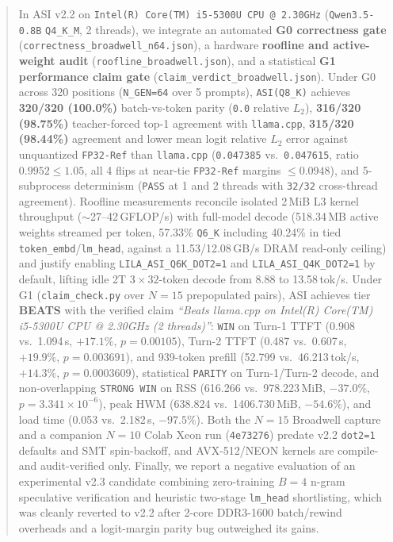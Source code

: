 \documentclass[11pt,a4paper]{article}
\begin{document}
\begin{abstract}
In ASI v2.2 on \texttt{Intel(R) Core(TM) i5-5300U CPU @ 2.30GHz} (\texttt{Qwen3.5-0.8B} \texttt{Q4\_K\_M}, 2 threads), we integrate an automated \textbf{G0 correctness gate} (\texttt{correctness\_broadwell\_n64.json}), a hardware \textbf{roofline and active-weight audit} (\texttt{roofline\_broadwell.json}), and a statistical \textbf{G1 performance claim gate} (\texttt{claim\_verdict\_broadwell.json}). Under G0 across 320 positions (\texttt{N\_GEN=64} over 5 prompts), \texttt{ASI(Q8\_K)} achieves \textbf{320/320 (100.0\%)} batch-vs-token parity (\texttt{0.0} relative $L_2$), \textbf{316/320 (98.75\%)} teacher-forced top-1 agreement with \texttt{llama.cpp}, \textbf{315/320 (98.44\%)} agreement and lower mean logit relative $L_2$ error against unquantized \texttt{FP32-Ref} than \texttt{llama.cpp} (\texttt{0.047385} vs.\ \texttt{0.047615}, ratio $0.9952 \le 1.05$, all 4 flips at near-tie \texttt{FP32-Ref} margins $\le 0.0948$), and 5-subprocess determinism (\texttt{PASS} at 1 and 2 threads with \texttt{32/32} cross-thread agreement). Roofline measurements reconcile isolated 2\,MiB L3 kernel throughput ($\sim$27--42\,GFLOP/s) with full-model decode (518.34\,MB active weights streamed per token, 57.33\% \texttt{Q6\_K} including 40.24\% in tied \texttt{token\_embd}/\texttt{lm\_head}, against a 11.53/12.08\,GB/s DRAM read-only ceiling) and justify enabling \texttt{LILA\_ASI\_Q6K\_DOT2=1} and \texttt{LILA\_ASI\_Q4K\_DOT2=1} by default, lifting idle 2T $3\times 32$-token decode from 8.88 to 13.58\,tok/s. Under G1 (\texttt{claim\_check.py} over $N=15$ prepopulated pairs), ASI achieves tier \textbf{BEATS} with the verified claim \emph{``Beats llama.cpp on Intel(R) Core(TM) i5-5300U CPU @ 2.30GHz (2 threads)''}: \texttt{WIN} on Turn-1 TTFT (0.908 vs.\ 1.094\,s, $+17.1\%$, $p=0.00105$), Turn-2 TTFT (0.487 vs.\ 0.607\,s, $+19.9\%$, $p=0.003691$), and 939-token prefill (52.799 vs.\ 46.213\,tok/s, $+14.3\%$, $p=0.0003609$), statistical \texttt{PARITY} on Turn-1/Turn-2 decode, and non-overlapping \texttt{STRONG WIN} on RSS (616.266 vs.\ 978.223\,MiB, $-37.0\%$, $p=3.341\times 10^{-6}$), peak HWM (638.824 vs.\ 1406.730\,MiB, $-54.6\%$), and load time (0.053 vs.\ 2.182\,s, $-97.5\%$). Both the $N=15$ Broadwell capture and a companion $N=10$ Colab Xeon run (\texttt{4e73276}) predate v2.2 \texttt{dot2=1} defaults and SMT spin-backoff, and AVX-512/NEON kernels are compile- and audit-verified only. Finally, we report a negative evaluation of an experimental v2.3 candidate combining zero-training $B=4$ n-gram speculative verification and heuristic two-stage \texttt{lm\_head} shortlisting, which was cleanly reverted to v2.2 after 2-core DDR3-1600 batch/rewind overheads and a logit-margin parity bug outweighed its gains.
\end{abstract}
\end{document}
